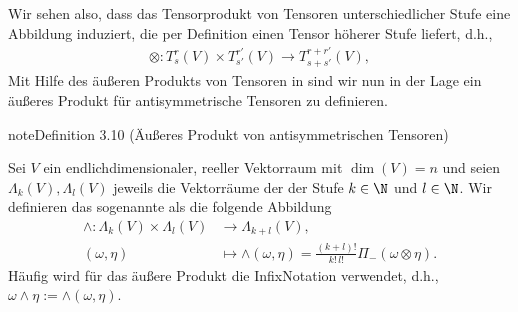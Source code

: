 \documentclass[letterpaper,10pt,german]{jupyterBook}
\begin{document}
\sphinxAtStartPar
Wir sehen also, dass das Tensorprodukt von Tensoren unterschiedlicher Stufe eine Abbildung induziert, die per Definition einen Tensor höherer Stufe liefert, d.h.,
\begin{equation*}
\begin{split}\otimes : T^r_s(V) \times T^{r'}_{s'}(V) \rightarrow T^{r+r'}_{s+s'}(V),\end{split}
\end{equation*}
\sphinxAtStartPar
Mit Hilfe des äußeren Produkts von Tensoren in {\hyperref[\detokenize{vektoranalysis/tensor:def:aeusseresProduktTensoren}]{}} sind wir nun in der Lage ein äußeres Produkt für antisymmetrische Tensoren zu definieren.
\label{vektoranalysis/tensor:def:aeusseresProdukt}
\begin{sphinxadmonition}{note}{Definition 3.10 (Äußeres Produkt von antisymmetrischen Tensoren)}



\sphinxAtStartPar
Sei \(V\) ein endlich\sphinxhyphen{}dimensionaler, reeller Vektorraum mit \(\operatorname{dim}(V) = n\) und seien \(\Lambda_k(V), \Lambda_l(V)\) jeweils die Vektorräume der  der Stufe \(k\in\N\) und \(l\in\N\).
Wir definieren das sogenannte  als die folgende Abbildung
\begin{equation*}
\begin{split}\wedge : \Lambda_k(V) \times \Lambda_l(V) &\rightarrow \Lambda_{k+l}(V),\\
(\omega, \eta) &\mapsto \wedge(\omega,\eta) = \frac{(k+l)!}{k! \, l!} \Pi_-(\omega \otimes \eta).\end{split}
\end{equation*}
\sphinxAtStartPar
Häufig wird für das äußere Produkt die Infix\sphinxhyphen{}Notation verwendet, d.h., \(\omega \wedge \eta :=  \wedge(\omega,\eta)\).
\end{sphinxadmonition}
\end{document}
